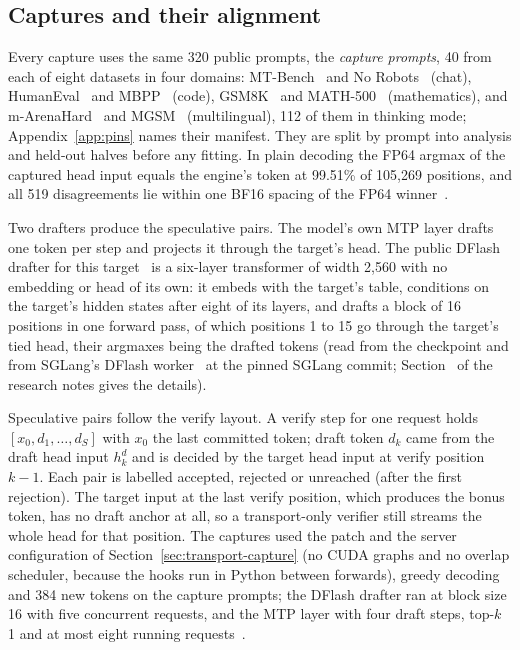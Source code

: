 \subsection{Captures and their alignment}\label{app:transport-capture}
Every capture uses the same 320 public prompts, the \emph{capture prompts}, 40 from each of eight datasets in four domains: MT-Bench~\cite{mtbench} and No Robots~\cite{norobots} (chat), HumanEval~\cite{humaneval} and MBPP~\cite{mbpp} (code), GSM8K~\cite{gsm8k} and MATH-500~\cite{hendrycksmath,lightman2024} (mathematics), and m-ArenaHard~\cite{ayaexpanse} and MGSM~\cite{mgsm} (multilingual), 112 of them in thinking mode; Appendix~\ref{app:pins} names their manifest. They are split by prompt into analysis and held-out halves before any fitting. In plain decoding the FP64 argmax of the captured head input equals the engine's token at 99.51\% of 105,269 positions, and all 519 disagreements lie within one BF16 spacing of the FP64 winner~.

Two drafters produce the speculative pairs. The model's own MTP layer drafts one token per step and projects it through the target's head. The public DFlash drafter for this target~\cite{dflash4bcard} is a six-layer transformer of width 2,560 with no embedding or head of its own: it embeds with the target's table, conditions on the target's hidden states after eight of its layers, and drafts a block of 16 positions in one forward pass, of which positions 1 to 15 go through the target's tied head, their argmaxes being the drafted tokens (read from the checkpoint and from SGLang's DFlash worker~\cite{sgdflashworker} at the pinned SGLang commit; Section~ of the research notes gives the details).

Speculative pairs follow the verify layout. A verify step for one request holds $[x_0,d_1,\dots,d_S]$ with $x_0$ the last committed token; draft token $d_k$ came from the draft head input $h^d_k$ and is decided by the target head input at verify position $k-1$. Each pair is labelled accepted, rejected or unreached (after the first rejection). The target input at the last verify position, which produces the bonus token, has no draft anchor at all, so a transport-only verifier still streams the whole head for that position. The captures used the patch and the server configuration of Section~\ref{sec:transport-capture} (no CUDA graphs and no overlap scheduler, because the hooks run in Python between forwards), greedy decoding and 384 new tokens on the capture prompts; the DFlash drafter ran at block size 16 with five concurrent requests, and the MTP layer with four draft steps, top-$k$ 1 and at most eight running requests~.


